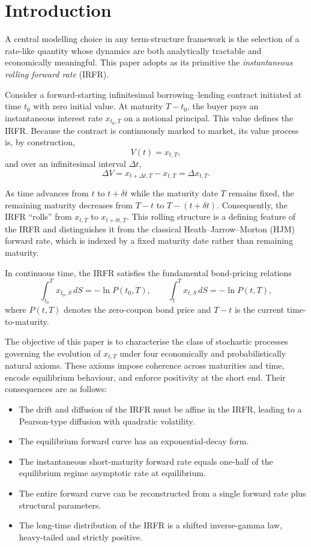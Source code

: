 \documentclass[12pt]{article}
\theoremstyle{statementstyle}
\begin{document}
\section{Introduction}
\label{sec:introduction}

A central modelling choice in any term-structure framework is the 
selection of a rate-like quantity whose dynamics are both analytically 
tractable and economically meaningful. This paper adopts as its 
primitive the \emph{instantaneous rolling forward rate} (IRFR). 

Consider a forward-starting infinitesimal borrowing--lending contract 
initiated at time $t_{0}$ with zero initial value. At maturity 
$T - t_{0}$, the buyer pays an instantaneous interest rate 
$x_{t_{0},T}$ on a notional principal. This value defines the IRFR. 
Because the contract is continuously marked to market, its value 
process is, by construction,
\[
V(t) = x_{t,T},
\]
and over an infinitesimal interval $\Delta t$,
\[
\Delta V = x_{t+\Delta t,T} - x_{t,T}
= \Delta x_{t,T}.
\]

As time advances from $t$ to $t + \delta t$ while the maturity 
date $T$ remains fixed, the remaining maturity decreases from $T - t$ 
to $T - (t + \delta t)$. Consequently, the IRFR ``rolls'' from 
$x_{t,T}$ to $x_{t+\delta t,T}$. This rolling structure is a defining 
feature of the IRFR and distinguishes it from the classical 
Heath--Jarrow--Morton (HJM) forward rate, which is indexed by a fixed 
maturity date rather than remaining maturity.

In continuous time, the IRFR satisfies the fundamental bond-pricing 
relations
\[
\int_{t_{0}}^{T} x_{t_{0},S}\,dS = -\ln P(t_{0},T),
\qquad
\int_{t}^{T} x_{t,S}\,dS = -\ln P(t,T),
\]
where $P(t,T)$ denotes the zero-coupon bond price and $T-t$ is the 
current time-to-maturity.

The objective of this paper is to characterise the class of stochastic
processes governing the evolution of $x_{t,T}$ under four economically
and probabilistically natural axioms. These
axioms impose coherence across maturities and time, encode equilibrium
behaviour, and enforce positivity at the short end. Their consequences
are as follows:

\begin{itemize}
\item The drift and diffusion of the IRFR must be affine in the IRFR,
      leading to a Pearson-type diffusion with quadratic volatility.
\item The equilibrium forward curve has an exponential-decay form.
\item The instantaneous short-maturity forward rate equals one-half of 
      the equilibrium regime asymptotic rate at equilibrium.
\item The entire forward curve can be reconstructed from a single 
      forward rate plus structural parameters.
\item The long-time distribution of the IRFR is a shifted 
      inverse-gamma law, heavy-tailed and strictly positive.
\end{itemize}
\end{document}
